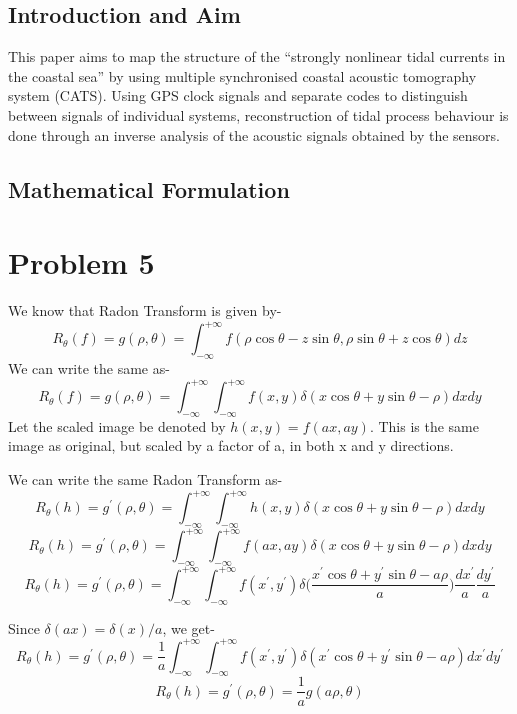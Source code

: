 \documentclass[a4paper,11pt]{article}
\numberwithin{definition}{section}
\numberwithin{mytheorem}{subsection}
\begin{document}
\subsection{Introduction and Aim}

This paper aims to map the structure of the ``strongly
nonlinear tidal currents in the coastal sea'' by using multiple synchronised coastal acoustic tomography system (CATS). Using GPS clock signals and separate codes to distinguish between signals of individual systems, reconstruction of tidal process behaviour is done through an inverse analysis of the acoustic signals obtained by the sensors.

\subsection{Mathematical Formulation}



\section{Problem 5}

We know that Radon Transform is given by-
$$R_\theta(f) =g(\rho, \theta)= \int_{-\infty}^{+\infty}f(\rho\cos\theta - z\sin\theta,\rho\sin \theta + z\cos\theta)dz $$
We can write the same as-
$$R_\theta(f) =g(\rho, \theta)= \int_{-\infty}^{+\infty}\int_{-\infty}^{+\infty}f(x,y)\delta(x\cos\theta+y\sin\theta -\rho)dxdy $$
Let the scaled image be denoted by $h(x,y) = f(ax, ay)$. This is the same image as original, but scaled by a factor of a, in both x and y directions.

We can write the same Radon Transform as-
$$ R_\theta(h) =g^{\prime}(\rho, \theta)= \int_{-\infty}^{+\infty}\int_{-\infty}^{+\infty}h(x,y)\delta(x\cos\theta+y\sin\theta -\rho)dxdy $$
$$ R_\theta(h) =g^{\prime}(\rho, \theta)= \int_{-\infty}^{+\infty}\int_{-\infty}^{+\infty}f(ax,ay)\delta(x\cos\theta+y\sin\theta -\rho)dxdy $$
$$ R_\theta(h) =g^{\prime}(\rho, \theta)= \int_{-\infty}^{+\infty}\int_{-\infty}^{+\infty}f(x^{\prime},y^{\prime})\delta\bigg(\frac{x^{\prime}\cos\theta+y^{\prime}\sin\theta -a\rho}{a}\bigg)\frac{dx^{\prime}}{a}\frac{dy^{\prime}}{a} $$

Since $\delta(ax) = \delta(x)/a$, we get-
$$ R_\theta(h) =g^{\prime}(\rho, \theta)= \frac{1}{a}\int_{-\infty}^{+\infty}\int_{-\infty}^{+\infty}f(x^{\prime},y^{\prime})\delta(x^{\prime}\cos\theta+y^{\prime}\sin\theta -a\rho)dx^{\prime}dy^{\prime} $$
$$ R_\theta(h) =g^{\prime}(\rho, \theta)= \frac{1}{a}g(a\rho, \theta) $$
\end{document}
